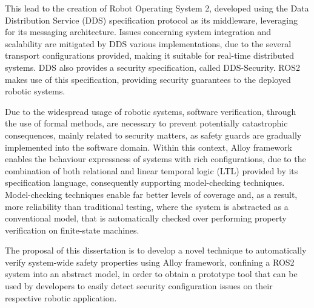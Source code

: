 This lead to the creation of Robot Operating System 2, developed using the Data Distribution Service (DDS) \cite{3} specification protocol as its middleware, leveraging for its messaging architecture. Issues concerning system integration and scalability are mitigated by DDS various implementations, due to the several transport configurations provided, making it suitable for real-time distributed systems. DDS also provides a security specification, called DDS-Security. ROS2 makes use of this specification, providing security guarantees to the deployed robotic systems. \cite{8442103}

Due to the widespread usage of robotic systems, software verification, through the use of formal methods, are necessary to prevent potentially catastrophic consequences, mainly related to security matters, as safety guards are gradually implemented into the software domain. \cite{carvalho2020analysis} Within this context, Alloy \cite{alloy-DJ, lwspecification} framework enables the behaviour expressness of systems with rich configurations, due to the combination of both relational and linear temporal logic (LTL) provided by its specification language, consequently supporting model-checking techniques. Model-checking techniques enable far better levels of coverage and, as a result, more reliability than traditional testing, where the system is abstracted as a conventional model, that is automatically checked over performing property verification on finite-state machines. \cite{beyer2017software}


The proposal of this dissertation is to develop a novel technique to automatically verify system-wide safety properties using Alloy framework, confining a ROS2 system into an abstract model, in order to obtain a prototype tool that can be used by developers to easily detect security configuration issues on their respective robotic application.



